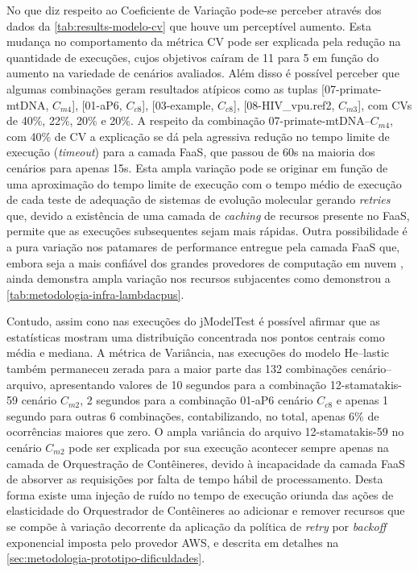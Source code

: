 \documentclass[english,brazilian]{UNISINOSmonografia} %
\begin{document}
No que diz respeito ao Coeficiente de Variação pode-se perceber através dos dados da \autoref{tab:results-modelo-cv} que houve um perceptível aumento.
%
Esta mudança no comportamento da métrica CV pode ser explicada pela redução na quantidade de execuções, cujos objetivos caíram de 11 para 5 em função do aumento na variedade de cenários avaliados.
%
Além disso é possível perceber que algumas combinações geram resultados atípicos como as tuplas [07-primate-mtDNA, $C_{m4}$], [01-aP6, $C_{c8}$], [03-example, $C_{c8}$], [08-HIV\_vpu.ref2, $C_{m3}$], com CVs de 40\%, 22\%, 20\% e 20\%.
%
A respeito da combinação 07-primate-mtDNA--$C_{m4}$, com 40\% de CV a explicação se dá pela agressiva redução no tempo limite de execução (\textit{timeout}) para a camada FaaS, que passou de 60s na maioria dos cenários para apenas 15s.
%
Esta ampla variação pode se originar em função de uma aproximação do tempo limite de execução com o tempo médio de execução de cada teste de adequação de sistemas de evolução molecular gerando \textit{retries} que, devido a existência de uma camada de \textit{caching} de recursos presente no FaaS, permite que as execuções subsequentes sejam mais rápidas.
%
Outra possibilidade é a pura variação nos patamares de performance entregue pela camada FaaS que, embora seja a mais confiável dos grandes provedores de computação em nuvem \cite{Wang2018}, ainda demonstra ampla variação nos recursos subjacentes como demonstrou a \autoref{tab:metodologia-infra-lambdacpus}.



Contudo, assim cono nas execuções do jModelTest é possível afirmar que as estatísticas mostram uma distribuição concentrada nos pontos centrais como média e mediana.
%
A métrica de Variância, nas execuções do modelo \textsf{He}--lastic também permaneceu zerada para a maior parte das 132 combinações cenário--arquivo, apresentando valores de 10 segundos para a combinação 12-stamatakis-59 cenário $C_{m2}$, 2 segundos para a combinação 01-aP6 cenário $C_{c8}$ e apenas 1 segundo para outras 6 combinações, contabilizando, no total, apenas 6\% de ocorrências maiores que zero.
%
O ampla variância do arquivo 12-stamatakis-59 no cenário $C_{m2}$ pode ser explicada por sua execução acontecer sempre apenas na camada de Orquestração de Contêineres, devido à incapacidade da camada FaaS de absorver as requisições por falta de tempo hábil de processamento.
%
Desta forma existe uma injeção de ruído no tempo de execução oriunda das ações de elasticidade do Orquestrador de Contêineres ao adicionar e remover recursos que se compõe à variação decorrente da aplicação da política de \textit{retry} por \textit{backoff} exponencial imposta pelo provedor AWS, e descrita em detalhes na \autoref{sec:metodologia-prototipo-dificuldades}. 
\end{document}
